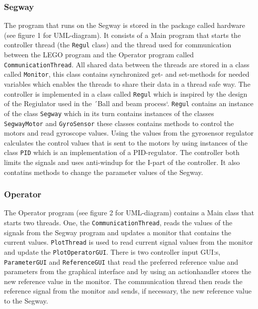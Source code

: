 \subsubsection{Segway}
The program that runs on the Segway is stored in the package called hardware (see figure 1 for UML-diagram). It consists of a Main program that starts the controller thread (the \texttt{Regul} class) and the thread used for communication between the LEGO program and the Operator program called \texttt{CommunicationThread}. All shared data between the threads are stored in a class called \texttt{Monitor}, this class contains synchronized get- and set-methods for needed variables which enables the threads to share their data in a thread safe way. The controller is implemented in a class called \texttt{Regul} which is inspired by the design of the Regiulator used in the ´Ball and beam process`. \texttt{Regul} contains an instance of the class \texttt{Segway} which in its turn contains instances of the classes \texttt{SegwayMotor} and \texttt{GyroSensor} these classes contains methods to control the motors and read gyroscope values. Using the values from the gyrosensor regulator calculates the control values that is sent to the motors by using instances of the class \texttt{PID} which is an implementation of a PID-regulator. The controller both limits the signals and uses anti-windup for the I-part of the controller. It also contatins methods to change the parameter values of the Segway.


\subsubsection{Operator}
The Operator program (see figure 2 for UML-diagram)  contains a Main class that starts two threads. One, the \texttt{CommunicationThread}, reads the values of the signals from the Segway program and updates a monitor that contains the current values. \texttt{PlotThread} is used to read current signal values from the monitor and update the \texttt{PlotOperatorGUI}. There is two controller input GUI:s, \texttt{ParameterGUI} and \texttt{ReferenceGUI} that read the preferred reference value and parameters from the graphical interface and by using an actionhandler stores the new reference value in the monitor. The communication thread then reads the reference signal from the monitor and sends, if necessary, the new reference value to the Segway.

